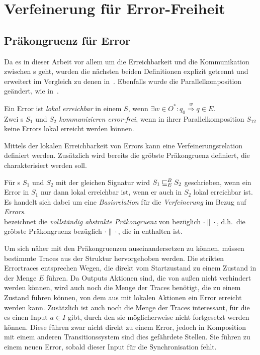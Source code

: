 \chapter{Verfeinerung für Error-Freiheit}

\section{Präkongruenz für Error}

Da es in dieser Arbeit vor allem um die Erreichbarkeit und die Kommunikation
zwischen \EIO{}s geht, wurden die nächsten beiden Definitionen explizit
getrennt und erweitert im Vergleich zu denen in~\cite{Vogler2014EIO}. Ebenfalls
wurde die Parallelkomposition geändert, wie in~\cite{Schlosser2012BA}.

\begin{Def}
  Ein Error ist \emph{lokal erreichbar} in einem \EIO{} $S$, wenn $\exists w\in O^*: q_0
  \overset{w}{\Rightarrow} q\in E$.\\
  Zwei \EIO{}s $S_1$ und $S_2$ \emph{kommunizieren error-frei}, wenn in ihrer
  Parallelkomposition $S_{12}$ keine Errors lokal erreicht werden können.
\end{Def}

Mittels der lokalen Erreichbarkeit von Errors kann eine
Verfeinerungsrelation definiert werden. Zusätzlich wird bereits die
gröbste Präkongruenz definiert, die charakterisiert werden soll.

\begin{Def}
\label{DefErrorBasisrel}
  Für \EIO{}s $S_1$ und $S_2$ mit der gleichen Signatur wird
  $S_1\sqsubseteq _E^B S_2$ geschrieben, wenn ein Error in $S_1$ nur dann lokal erreichbar ist, wenn er
  auch in $S_2$ lokal erreichbar ist. Es handelt sich dabei um eine
  \emph{Basisrelation} für die \emph{Verfeinerung} im Bezug auf \emph{Errors}.\\
  \ECRel{} bezeichnet die \emph{vollständig abstrakte Präkongruenz} von \EBRel{}
  bezüglich $\cdot\|\cdot$, d.h.\ die gröbste Präkongruenz bezüglich
  $\cdot\|\cdot$, die in \EBRel{} enthalten ist.
\end{Def}

Um sich näher mit den Präkongruenzen auseinandersetzen zu können, müssen bestimmte Traces
aus der Struktur hervorgehoben werden. Die strikten Errortraces entsprechen Wegen, die
direkt vom Startzustand zu einem Zustand in der Menge $E$ führen. Da Outputs Aktionen
sind, die von außen nicht verhindert werden können, wird auch noch die
Menge der Traces benötigt, die zu einem Zustand führen können, von dem aus mit lokalen Aktionen
ein Error erreicht werden kann. Zusätzlich ist auch noch die Menge der Traces
interessant, für die es einen Input $a\in I$ gibt, durch den sie möglicherweise nicht
fortgesetzt werden können. Diese führen zwar nicht direkt zu einem Error,
jedoch in Komposition mit einem anderen Transitionssystem sind
dies gefährdete Stellen. Sie führen zu einem neuen Error, sobald dieser Input
für die Synchronisation fehlt.

